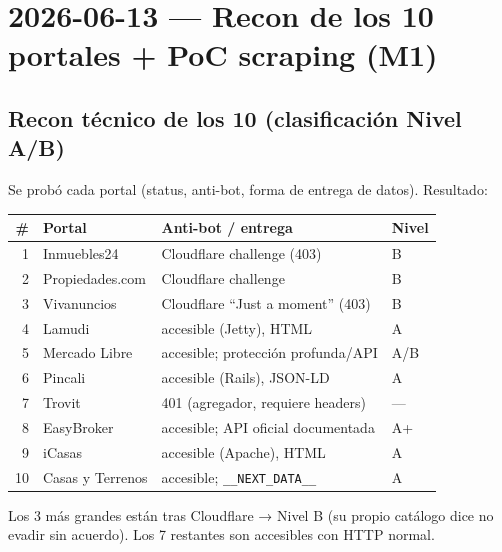 \documentclass[11pt]{article}
\newcommand{\codigo}[1]{\texttt{#1}}
\begin{document}
\section*{2026-06-13 — Recon de los 10 portales + PoC scraping (M1)}

\subsection*{Recon técnico de los 10 (clasificación Nivel A/B)}
Se probó cada portal (status, anti-bot, forma de entrega de datos). Resultado:

\begin{center}\footnotesize
\begin{tabular}{@{}rlll@{}}
\toprule
\# & Portal & Anti-bot / entrega & Nivel \\
\midrule
1  & Inmuebles24      & Cloudflare challenge (403)        & B \\
2  & Propiedades.com  & Cloudflare challenge              & B \\
3  & Vivanuncios      & Cloudflare ``Just a moment'' (403)& B \\
4  & Lamudi           & accesible (Jetty), HTML           & A \\
5  & Mercado Libre    & accesible; protección profunda/API& A/B \\
6  & Pincali          & accesible (Rails), JSON-LD        & A \\
7  & Trovit           & 401 (agregador, requiere headers) & — \\
8  & EasyBroker       & accesible; API oficial documentada& A+ \\
9  & iCasas           & accesible (Apache), HTML          & A \\
10 & Casas y Terrenos & accesible; \codigo{\_\_NEXT\_DATA\_\_} & A \\
\bottomrule
\end{tabular}
\end{center}

\noindent Los 3 más grandes están tras Cloudflare → Nivel B (su propio catálogo
dice no evadir sin acuerdo). Los 7 restantes son accesibles con HTTP normal.
\end{document}
